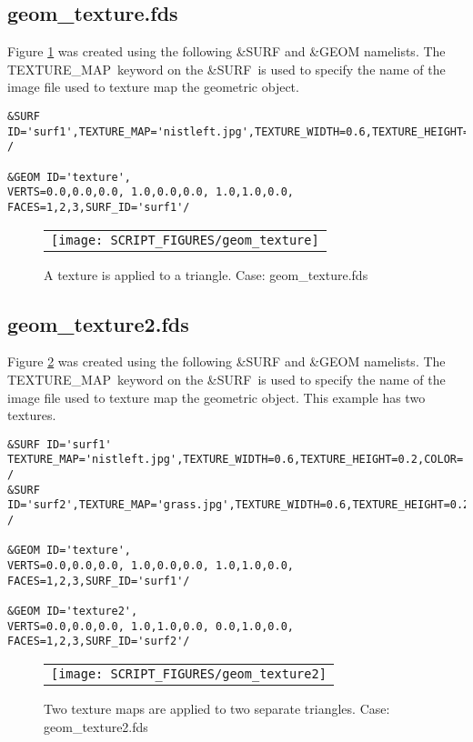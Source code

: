 \documentclass[12pt]{article}
\begin{document}
\subsection{geom\_texture.fds}
Figure \ref{fig:geom_texture} was created using the following \&SURF and \&GEOM namelists.
The {\ct TEXTURE\_MAP}\ keyword on the {\ct \&SURF}\ is used to specify the name of the image
file used to texture map the geometric object.

{\small
\begin{verbatim}
&SURF ID='surf1',TEXTURE_MAP='nistleft.jpg',TEXTURE_WIDTH=0.6,TEXTURE_HEIGHT=0.2,COLOR='BLUE' /

&GEOM ID='texture',
VERTS=0.0,0.0,0.0, 1.0,0.0,0.0, 1.0,1.0,0.0,
FACES=1,2,3,SURF_ID='surf1'/
\end{verbatim}
}

\begin{figure}
\begin{center}
\begin{tabular}{c}
 \texttt{[image: SCRIPT\_FIGURES/geom\_texture]}
  \end{tabular}
\end{center}
 \caption{A texture is applied to a triangle. Case: geom\_texture.fds}
\label{fig:geom_texture}
\end{figure}

\subsection{geom\_texture2.fds}
Figure \ref{fig:geom_texture2} was created using the following \&SURF and \&GEOM namelists.
The {\ct TEXTURE\_MAP}\ keyword on the {\ct \&SURF}\ is used to specify the name of the image
file used to texture map the geometric object. This example has two textures.

{\small
\begin{verbatim}
&SURF ID='surf1' TEXTURE_MAP='nistleft.jpg',TEXTURE_WIDTH=0.6,TEXTURE_HEIGHT=0.2,COLOR='BLUE' /
&SURF ID='surf2',TEXTURE_MAP='grass.jpg',TEXTURE_WIDTH=0.6,TEXTURE_HEIGHT=0.2,COLOR='GREEN' /

&GEOM ID='texture',
VERTS=0.0,0.0,0.0, 1.0,0.0,0.0, 1.0,1.0,0.0,
FACES=1,2,3,SURF_ID='surf1'/

&GEOM ID='texture2',
VERTS=0.0,0.0,0.0, 1.0,1.0,0.0, 0.0,1.0,0.0,
FACES=1,2,3,SURF_ID='surf2'/
\end{verbatim}
}

\begin{figure}
\begin{center}
\begin{tabular}{c}
 \texttt{[image: SCRIPT\_FIGURES/geom\_texture2]}
  \end{tabular}
\end{center}
 \caption{Two texture maps are applied to two separate triangles.  Case: geom\_texture2.fds}
\label{fig:geom_texture2}
\end{figure}
\end{document}
